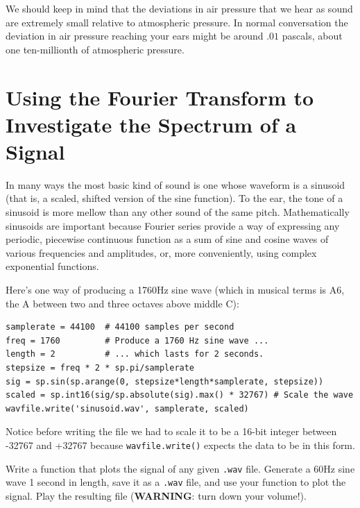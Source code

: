 We should keep in mind that the deviations in air pressure that we hear as sound are extremely small relative to atmospheric pressure.
In normal conversation the deviation in air pressure reaching your ears might be around $.01$ pascals, about one ten-millionth of atmospheric pressure.


\section*{Using the Fourier Transform to Investigate the Spectrum of a Signal}

In many ways the most basic kind of sound is one whose waveform is a sinusoid (that is, a scaled, shifted version of the sine function). 
To the ear, the tone of a sinusoid is more mellow than any other sound of the same pitch. 
Mathematically sinusoids are important because Fourier series provide a way of expressing any periodic, piecewise continuous function as a sum of sine and cosine waves of various frequencies and amplitudes, or, more conveniently, using complex exponential functions.

Here's one way of producing a 1760Hz sine wave (which in musical terms is A6, the A between two and three octaves above middle C):

\begin{lstlisting}
samplerate = 44100	# 44100 samples per second
freq = 1760			# Produce a 1760 Hz sine wave ...
length = 2			# ... which lasts for 2 seconds.
stepsize = freq * 2 * sp.pi/samplerate
sig = sp.sin(sp.arange(0, stepsize*length*samplerate, stepsize))
scaled = sp.int16(sig/sp.absolute(sig).max() * 32767) # Scale the wave
wavfile.write('sinusoid.wav', samplerate, scaled)
\end{lstlisting}

Notice before writing the file we had to scale it to be a 16-bit integer between -32767 and +32767 because \texttt{wavfile.write()} expects the data to be in this form.

\begin{problem} %
Write a function that plots the signal of any given \texttt{.wav} file. Generate a 60Hz sine wave 1 second in length, save it as a \texttt{.wav} file, and use your function to plot the signal. Play the resulting file (\textbf{WARNING}: turn down your volume!).
\end{problem}


